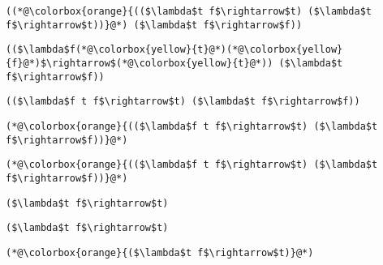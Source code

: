 \documentclass{beamer}
\begin{document}
\begin{frame}[fragile]{\CurrentSection}
\lstset{basicstyle=\ttfamily\small}\lstset{numbers=none}\lstset{language=ML}\begin{lstlisting}
((*@\colorbox{orange}{(($\lambda$t f$\rightarrow$t) ($\lambda$t f$\rightarrow$t))}@*) ($\lambda$t f$\rightarrow$f))
\end{lstlisting}
\pause\lstset{language=ML}\begin{lstlisting}
(($\lambda$f(*@\colorbox{yellow}{t}@*)(*@\colorbox{yellow}{f}@*)$\rightarrow$(*@\colorbox{yellow}{t}@*)) ($\lambda$t f$\rightarrow$f))
\end{lstlisting}

\end{frame}

\begin{frame}[fragile]{\CurrentSection}
\lstset{basicstyle=\ttfamily\small}\lstset{numbers=none}\lstset{language=ML}\begin{lstlisting}
(($\lambda$f t f$\rightarrow$t) ($\lambda$t f$\rightarrow$f))
\end{lstlisting}
\pause\lstset{language=ML}\begin{lstlisting}
(*@\colorbox{orange}{(($\lambda$f t f$\rightarrow$t) ($\lambda$t f$\rightarrow$f))}@*)
\end{lstlisting}

\end{frame}

\begin{frame}[fragile]{\CurrentSection}
\lstset{basicstyle=\ttfamily\small}\lstset{numbers=none}\lstset{language=ML}\begin{lstlisting}
(*@\colorbox{orange}{(($\lambda$f t f$\rightarrow$t) ($\lambda$t f$\rightarrow$f))}@*)
\end{lstlisting}
\pause\lstset{language=ML}\begin{lstlisting}
($\lambda$t f$\rightarrow$t)
\end{lstlisting}

\end{frame}

\begin{frame}[fragile]{\CurrentSection}
\lstset{basicstyle=\ttfamily\small}\lstset{numbers=none}\lstset{language=ML}\begin{lstlisting}
($\lambda$t f$\rightarrow$t)
\end{lstlisting}
\pause\lstset{language=ML}\begin{lstlisting}
(*@\colorbox{orange}{($\lambda$t f$\rightarrow$t)}@*)
\end{lstlisting}

\end{frame}
\end{document}
